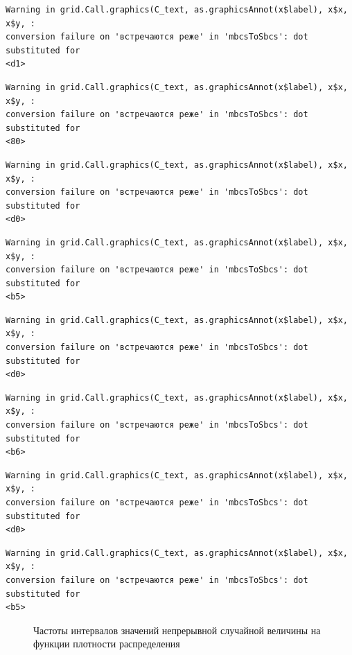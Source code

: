 \documentclass[
  letterpaper,
]{scrbook}
\theoremstyle{definition}
\theoremstyle{remark}
\begin{document}
\begin{verbatim}
Warning in grid.Call.graphics(C_text, as.graphicsAnnot(x$label), x$x, x$y, :
conversion failure on 'встречаются реже' in 'mbcsToSbcs': dot substituted for
<d1>
\end{verbatim}

\begin{verbatim}
Warning in grid.Call.graphics(C_text, as.graphicsAnnot(x$label), x$x, x$y, :
conversion failure on 'встречаются реже' in 'mbcsToSbcs': dot substituted for
<80>
\end{verbatim}

\begin{verbatim}
Warning in grid.Call.graphics(C_text, as.graphicsAnnot(x$label), x$x, x$y, :
conversion failure on 'встречаются реже' in 'mbcsToSbcs': dot substituted for
<d0>
\end{verbatim}

\begin{verbatim}
Warning in grid.Call.graphics(C_text, as.graphicsAnnot(x$label), x$x, x$y, :
conversion failure on 'встречаются реже' in 'mbcsToSbcs': dot substituted for
<b5>
\end{verbatim}

\begin{verbatim}
Warning in grid.Call.graphics(C_text, as.graphicsAnnot(x$label), x$x, x$y, :
conversion failure on 'встречаются реже' in 'mbcsToSbcs': dot substituted for
<d0>
\end{verbatim}

\begin{verbatim}
Warning in grid.Call.graphics(C_text, as.graphicsAnnot(x$label), x$x, x$y, :
conversion failure on 'встречаются реже' in 'mbcsToSbcs': dot substituted for
<b6>
\end{verbatim}

\begin{verbatim}
Warning in grid.Call.graphics(C_text, as.graphicsAnnot(x$label), x$x, x$y, :
conversion failure on 'встречаются реже' in 'mbcsToSbcs': dot substituted for
<d0>
\end{verbatim}

\begin{verbatim}
Warning in grid.Call.graphics(C_text, as.graphicsAnnot(x$label), x$x, x$y, :
conversion failure on 'встречаются реже' in 'mbcsToSbcs': dot substituted for
<b5>
\end{verbatim}

\begin{figure}


\caption{\label{fig-continuous-freqs}Частоты интервалов значений
непрерывной случайной величины на функции плотности распределения}

\end{figure}%
\end{document}
